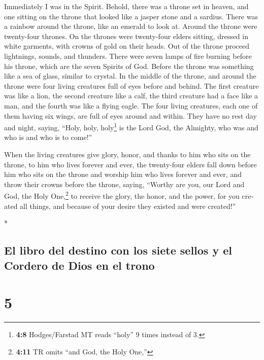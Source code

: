 \begin{paracol}{2}
\begin{otherlanguage}{english}
 Immediately I was in the Spirit. Behold, there was a
throne set in heaven, and one sitting on the throne  that
looked like a jasper stone and a sardius. There was a rainbow around the
throne, like an emerald to look at.  Around the throne
were twenty-four thrones. On the thrones were twenty-four elders
sitting, dressed in white garments, with crowns of gold on their heads.
 Out of the throne proceed lightnings, sounds, and
thunders. There were seven lamps of fire burning before his throne,
which are the seven Spirits of God.  Before the throne was
something like a sea of glass, similar to crystal. In the middle of the
throne, and around the throne were four living creatures full of eyes
before and behind.  The first creature was like a lion,
the second creature like a calf, the third creature had a face like a
man, and the fourth was like a flying eagle.  The four
living creatures, each one of them having six wings, are full of eyes
around and within. They have no rest day and night, saying, ``Holy,
holy, holy\footnote{\textbf{4:8} Hodges/Farstad MT reads ``holy'' 9
  times instead of 3.} is the Lord God, the Almighty, who was and who is
and who is to come!''

 When the living creatures give glory, honor, and thanks
to him who sits on the throne, to him who lives forever and ever,
 the twenty-four elders fall down before him who sits on
the throne and worship him who lives forever and ever, and throw their
crowns before the throne, saying,  ``Worthy are you, our
Lord and God, the Holy One,\footnote{\textbf{4:11} TR omits ``and God,
  the Holy One,''} to receive the glory, the honor, and the power, for
you created all things, and because of your desire they existed and were
created!''

\end{otherlanguage}

\switchcolumn[0]*

\hypertarget{el-libro-del-destino-con-los-siete-sellos-y-el-cordero-de-dios-en-el-trono}{%
\subsection{El libro del destino con los siete sellos y el Cordero de
Dios en el
trono}\label{el-libro-del-destino-con-los-siete-sellos-y-el-cordero-de-dios-en-el-trono}}

\hypertarget{section-8}{%
\section{5}\label{section-8}}


\end{paracol}
